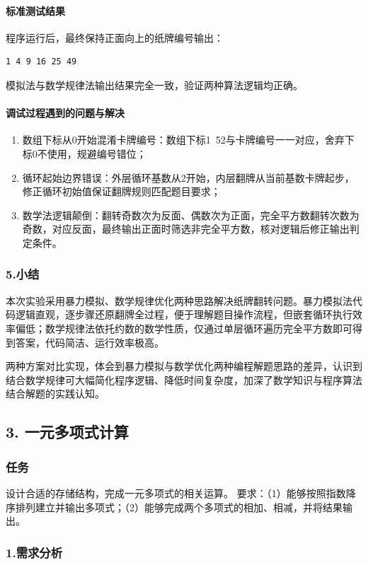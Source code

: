 \documentclass{ctexart}
\begin{document}
\paragraph{标准测试结果}
程序运行后，最终保持正面向上的纸牌编号输出：
\begin{verbatim}
1 4 9 16 25 49
\end{verbatim}
模拟法与数学规律法输出结果完全一致，验证两种算法逻辑均正确。

\paragraph{调试过程遇到的问题与解决}
\begin{enumerate}
    \item 数组下标从0开始混淆卡牌编号：数组下标1~52与卡牌编号一一对应，舍弃下标0不使用，规避编号错位；
    \item 循环起始边界错误：外层循环基数从2开始，内层翻牌从当前基数卡牌起步，修正循环初始值保证翻牌规则匹配题目要求；
    \item 数学法逻辑颠倒：翻转奇数次为反面、偶数次为正面，完全平方数翻转次数为奇数，对应反面，最终输出正面时筛选非完全平方数，核对逻辑后修正输出判定条件。
\end{enumerate}

\subsubsection{5.小结}
本次实验采用暴力模拟、数学规律优化两种思路解决纸牌翻转问题。暴力模拟法代码逻辑直观，逐步骤还原翻牌全过程，便于理解题目操作流程，但嵌套循环执行效率偏低；数学规律法依托约数的数学性质，仅通过单层循环遍历完全平方数即可得到答案，代码简洁、运行效率极高。

两种方案对比实现，体会到暴力模拟与数学优化两种编程解题思路的差异，认识到结合数学规律可大幅简化程序逻辑、降低时间复杂度，加深了数学知识与程序算法结合解题的实践认知。


\subsection{3. 一元多项式计算}
\subsubsection{任务}
设计合适的存储结构，完成一元多项式的相关运算。
要求：（1）能够按照指数降序排列建立并输出多项式；（2）能够完成两个多项式的相加、相减，并将结果输出。

\subsubsection{1.需求分析}
\end{document}
